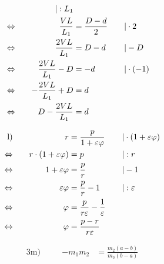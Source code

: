 \begin{exercise}
\begin{minipage}[t]{0.47\linewidth}
\begin{alignat*}{3}
        &
        \quad&|:L_{1}
        \\
        \Leftrightarrow&\quad
        &
        \frac{VL}{L_{1}}&=\frac{D-d}{2}
        &
        \quad&|\cdot2
        \\
        \Leftrightarrow&\quad
        &
        \frac{2VL}{L_{1}}&=D-d
        &
        \quad&|-D
        \\
        \Leftrightarrow&\quad
        &
        \frac{2VL}{L_{1}}-D&=-d
        &
        \quad&|\cdot(-1)
        \\
        \Leftrightarrow&\quad
        &
        -\frac{2VL}{L_{1}}+D&=d
        &
        \quad&\relax
        \\
        \Leftrightarrow&\quad
        &
        D-\frac{2VL}{L_{1}}&=d
        &
        \quad&\relax
      \end{alignat*}
    \end{minipage}\hfill
    \begin{minipage}[t]{0.51\linewidth}
      \makeatletter\@fleqntrue\makeatother
      \begin{alignat*}{3}
        \text{l)}&\quad
        &
        r&=\frac{p}{1+\varepsilon\varphi}
        &
        \quad&|\cdot(1+\varepsilon\varphi)
        \\
        \Leftrightarrow&\quad
        &
        r\cdot(1+\varepsilon\varphi)&=p
        &
        \quad&|:r
        \\
        \Leftrightarrow&\quad
        &
        1+\varepsilon\varphi&=\frac{p}{r}
        &
        \quad&|-1
        \\
        \Leftrightarrow&\quad
        &
        \varepsilon\varphi&=\frac{p}{r}-1
        &
        \quad&|:\varepsilon
        \\
        \Leftrightarrow&\quad
        &
        \varphi&=\frac{p}{r\varepsilon}-\frac{1}{\varepsilon}
        &
        \quad&\relax
        \\
        \Leftrightarrow&\quad
        &
        \varphi&=\frac{p-r}{r\varepsilon}
        &
        \quad&\relax
      \end{alignat*}
    \end{minipage}
    \begin{minipage}[t]{0.47\linewidth}
      \makeatletter\@fleqntrue\makeatother
      \begin{alignat*}{3}
        \text{m)}&\quad
        &
        -m_{1}m_{2}&=\frac{m_{2}(a-b)}{m_{3}(b-a)}

\end{alignat*}
\end{minipage}
\end{exercise}
